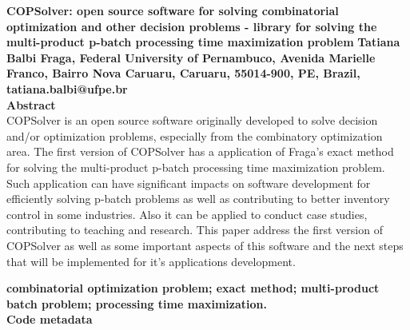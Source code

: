 \documentclass[11pt, letterpaper]{article}
\begin{document}
\noindent
\textbf{COPSolver: open source software for solving combinatorial optimization and other decision problems - library for solving the multi-product p-batch processing time maximization problem}
\vskip0.5cm
\noindent
\textbf{Tatiana Balbi Fraga, Federal University of Pernambuco, Avenida Marielle
Franco, Bairro Nova Caruaru, Caruaru, 55014-900, PE, Brazil, tatiana.balbi@ufpe.br}\\

\noindent
\textbf{Abstract}\\
COPSolver is an open source software originally developed to solve decision and/or optimization problems, especially from the combinatory optimization area. The first version of COPSolver has a application of Fraga's exact method for solving the multi-product p-batch processing time maximization problem. Such application can have significant impacts on software development for efficiently solving p-batch problems as well as contributing to better inventory control in some industries. Also it can be applied to conduct case studies, contributing to teaching and research. This paper address the first version of COPSolver as well as some important aspects of this software and the next steps that will be implemented for it's applications development.
\vskip0.5cm

\noindent
\textbf{combinatorial optimization problem; exact method; multi-product batch problem; processing time maximization.}\\
\vskip0.5cm
\newpage
\noindent
\textbf{Code metadata}\\
\end{document}
